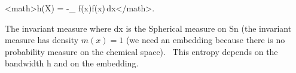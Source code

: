 \:<math>h(X) = -\int_ f(x)\log f(x)\,dx</math>.



The invariant measure where dx is the Spherical measure on Sn (the invariant measure has density $m(x)=1$ (we need an embedding because there is no probability measure on the chemical space). 
This entropy depends on the bandwidth h and on the embedding.
